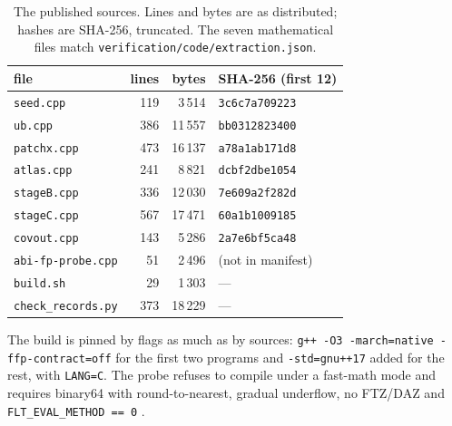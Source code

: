 \documentclass[11pt,a4paper]{article}
\newcommand{\code}[1]{\texttt{\small #1}}
\newcommand{\sha}[1]{\texttt{\scriptsize #1}}
\begin{document}
\begin{table}[t]
\centering\small
\caption{The published sources. Lines and bytes are as distributed; hashes are SHA-256, truncated.
The seven mathematical files match \code{verification/code/extraction.json}.}
\label{tab:files}
\begin{tabular}{lrrl}
\toprule
file & lines & bytes & SHA-256 (first 12) \\
\midrule
\code{seed.cpp}    & 119 & 3\,514  & \sha{3c6c7a709223} \\
\code{ub.cpp}      & 386 & 11\,557 & \sha{bb0312823400} \\
\code{patchx.cpp}  & 473 & 16\,137 & \sha{a78a1ab171d8} \\
\code{atlas.cpp}   & 241 & 8\,821  & \sha{dcbf2dbe1054} \\
\code{stageB.cpp}  & 336 & 12\,030 & \sha{7e609a2f282d} \\
\code{stageC.cpp}  & 567 & 17\,471 & \sha{60a1b1009185} \\
\code{covout.cpp}  & 143 & 5\,286  & \sha{2a7e6bf5ca48} \\
\midrule
\code{abi-fp-probe.cpp} & 51 & 2\,496 & (not in manifest) \\
\code{build.sh}         & 29 & 1\,303 & --- \\
\code{check\_records.py} & 373 & 18\,229 & --- \\
\bottomrule
\end{tabular}
\end{table}

The build is pinned by flags as much as by sources: \code{g++ -O3 -march=native -ffp-contract=off}
for the first two programs and \code{-std=gnu++17} added for the rest, with \code{LANG=C}. The probe
refuses to compile under a fast-math mode and requires binary64 with round-to-nearest, gradual
underflow, no FTZ/DAZ and \code{FLT\_EVAL\_METHOD == 0} \citep{IEEE7542019,Higham2002Accuracy}.
\end{document}
